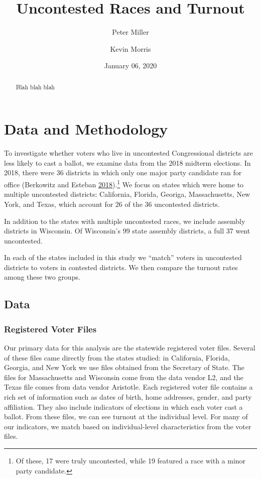 \documentclass[
  12pt,
]{article}
\title{Uncontested Races and Turnout}
\author{Peter Miller \and Kevin Morris}
\date{January 06, 2020}
\begin{document}
\maketitle
\begin{abstract}
Blah blah blah
\end{abstract}

\pagebreak

\hypertarget{data-and-methodology}{%
\section*{Data and Methodology}\label{data-and-methodology}}

To investigate whether voters who live in uncontested Congressional districts are less likely to cast a ballot, we examine data from the 2018 midterm elections. In 2018, there were 36 districts in which only one major party candidate ran for office (Berkowitz and Esteban \protect\hyperlink{ref-wapo}{2018}).\footnote{Of these, 17 were truly uncontested, while 19 featured a race with a minor party candidate.} We focus on states which were home to multiple uncontested districts: California, Florida, Georiga, Massachusetts, New York, and Texas, which account for 26 of the 36 uncontested districts.

In addition to the states with multiple uncontested races, we include assembly districts in Wisconsin. Of Wisconsin's 99 state assembly districts, a full 37 went uncontested.

In each of the states included in this study we ``match'' voters in uncontested districts to voters in contested districts. We then compare the turnout rates among these two groups.

\hypertarget{data}{%
\subsection*{Data}\label{data}}

\hypertarget{registered-voter-files}{%
\subsubsection*{Registered Voter Files}\label{registered-voter-files}}

Our primary data for this analysis are the statewide registered voter files. Several of these files came directly from the states studied: in California, Florida, Georgia, and New York we use files obtained from the Secretary of State. The files for Massachusetts and Wisconsin come from the data vendor L2, and the Texas file comes from data vendor Aristotle. Each registered voter file contains a rich set of information such as dates of birth, home addresses, gender, and party affiliation. They also include indicators of elections in which each voter cast a ballot. From these files, we can see turnout at the individual level. For many of our indicators, we match based on individual-level characteristics from the voter files.
\end{document}
